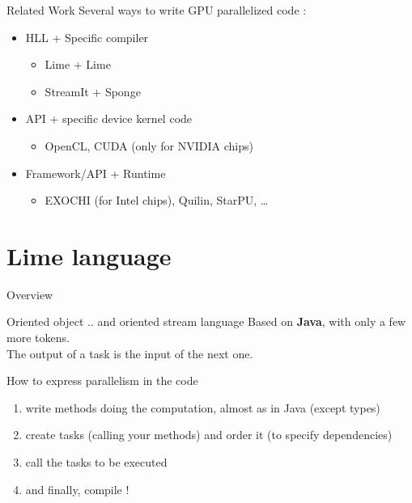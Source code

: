 \documentclass[10pt, compress]{beamer}
\begin{document}
\begin{frame}{Related Work}
Several ways to write GPU parallelized code :
\begin{itemize}
\item HLL + Specific compiler 
    \begin{itemize}
    \item Lime + Lime
    \item StreamIt + Sponge
    \end{itemize}
\item API + specific device kernel code
    \begin{itemize}
    \item OpenCL, CUDA (only for NVIDIA chips)
    \end{itemize}
\item Framework/API + Runtime
    \begin{itemize}
    \item EXOCHI (for Intel chips), Quilin, StarPU, \ldots 
    \end{itemize}
\end{itemize}
\end{frame}

\section{Lime language}

\begin{frame}{Overview}
    \begin{block}{Oriented object .. and oriented stream language}
    Based on \textbf{Java}, with only a few more tokens.\\
    The output of a task is the input of the next one.
    \end{block}
    \begin{block}{How to express parallelism in the code}
        \begin{enumerate}
        \item write methods doing the computation, almost as in Java (except types)
        \item create tasks (calling your methods) and order it (to specify dependencies)
        \item call the tasks to be executed
        \item and finally, compile !
        \end{enumerate}
    \end{block}
\end{frame}
\end{document}
